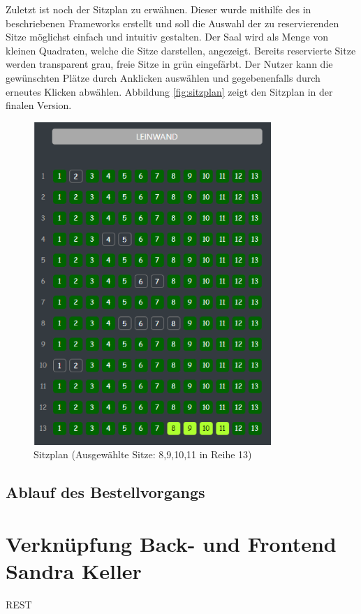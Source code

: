 	Zuletzt ist noch der Sitzplan zu erwähnen. Dieser wurde mithilfe des in %
	beschriebenen Frameworks erstellt und soll die Auswahl der zu reservierenden Sitze möglichst einfach und intuitiv gestalten. Der Saal wird als Menge von kleinen Quadraten, welche die Sitze darstellen, angezeigt. Bereits reservierte Sitze werden transparent grau, freie Sitze in grün eingefärbt. Der Nutzer kann die gewünschten Plätze durch Anklicken auswählen und gegebenenfalls durch erneutes Klicken abwählen. Abbildung \vref{fig:sitzplan} zeigt den Sitzplan in der finalen Version.
	
	\begin{figure}[H]
		\centering 
		\includegraphics[width=9cm]{img/sitzplan.png}
		\captionsetup{format=hang}
		\caption[Sitzplan]{\label{fig:sitzplan} Sitzplan (Ausgewählte Sitze: 8,9,10,11 in Reihe 13)}
	\end{figure}

	\subsection{Ablauf des Bestellvorgangs}
	
	
	\section[Verknüpfung Back- und Frontend]{Verknüpfung Back- und Frontend {\hfill \normalsize Sandra Keller}}
	REST

